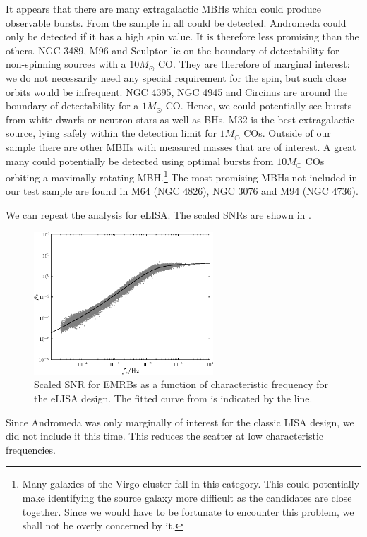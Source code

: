 It appears that there are many extragalactic MBHs which could produce observable bursts. From the sample in  all could be detected. Andromeda could only be detected if it has a high spin value. It is therefore less promising than the others. NGC 3489, M96 and Sculptor lie on the boundary of detectability for non-spinning sources with a $10 M_\odot$ CO. They are therefore of marginal interest: we do not necessarily need any special requirement for the spin, but such close orbits would be infrequent. NGC 4395, NGC 4945 and Circinus are around the boundary of detectability for a $1 M_\odot$ CO. Hence, we could potentially see bursts from white dwarfs or neutron stars as well as BHs. M32 is the best extragalactic source, lying safely within the detection limit for $1 M_\odot$ COs. Outside of our sample there are other MBHs with measured masses that are of interest. A great many could potentially be detected using optimal bursts from $10 M_\odot$ COs orbiting a maximally rotating MBH.\footnote{Many galaxies of the Virgo cluster fall in this category. This could potentially make identifying the source galaxy more difficult as the candidates are close together. Since we would have to be fortunate to encounter this problem, we shall not be overly concerned by it.} The most promising MBHs not included in our test sample are found in M64 (NGC 4826), NGC 3076 and M94 (NGC 4736).

We can repeat the analysis for eLISA. The scaled SNRs are shown in .
\begin{figure}
\centering
 \includegraphics[width=0.6\textwidth]{./images/Fig_SNR_scaled_fit_eLISA}
 \caption{Scaled SNR for EMRBs as a function of characteristic frequency for the eLISA design. The fitted curve from  is indicated by the line.}
\label{fig:scaled-SNR-eLISA}
\end{figure}
Since Andromeda was only marginally of interest for the classic LISA design, we did not include it this time. This reduces the scatter at low characteristic frequencies.

